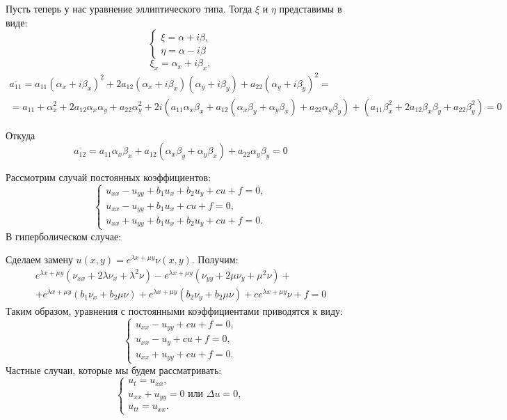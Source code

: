 \documentclass[11pt]{article}
\begin{document}
Пусть теперь у нас уравнение эллиптического типа. Тогда \(\xi\) и \(\eta\) представимы в виде:
\begin{equation*}
\begin{cases}
\xi = \alpha + i\beta, \\
\eta = \alpha - i\beta
\end{cases}
\end{equation*}
\begin{equation*}
\xi_x = \alpha_x + i\beta_x,
\end{equation*}
\begin{multline*}
\overline{a_{11}} = a_{11}(\alpha_x + i\beta_x)^2 +
2a_{12}(\alpha_x + i\beta_x)(\alpha_y + i\beta_y) + a_{22}(\alpha_y + i\beta_y)^2 = \\
= a_{11} + \alpha_x^2 + 2a_{12}\alpha_x\alpha_y + a_{22}\alpha_y^2 + 2i(a_{11}\alpha_x\beta_x +
a_{12}(\alpha_x\beta_y + \alpha_y\beta_x) + a_{22}\alpha_y\beta_y) + (a_{11}\beta_x^2 +
2a_{12}\beta_x\beta_y + a_{22}\beta_y^2) = 0
\end{multline*}

Откуда
\begin{equation*}
\overline{a_{12}} = a_{11}\alpha_x\beta_x + a_{12}(\alpha_x\beta_y + \alpha_y\beta_x) + a_{22}\alpha_y\beta_y = 0
\end{equation*}

Рассмотрим случай постоянных коэффициентов:
\begin{equation}
\begin{cases}
u_{xx} - u_{yy} + b_1u_x + b_2u_y + cu + f = 0, \\
u_{xx} - u_{yy} + b_1u_x + cu + f = 0, \\
u_{xx} + u_{yy} + b_1u_x + b_2u_y + cu + f = 0.
\end{cases}
\end{equation}
В гиперболическом случае:

Сделаем замену \(u(x, y) = e^{\lambda x + \mu y}\nu(x, y)\). Получим:
\begin{multline*}
e^{\lambda x + \mu y}(\nu_{xx} + 2\lambda\nu_x + \lambda^2\nu) - e^{\lambda x + \mu y}(\nu_{yy} + 2\mu\nu_y + \mu^2\nu) + \\
+ e^{\lambda x + \mu y}(b_1\nu_x + b_2\mu\nu) + e^{\lambda x + \mu y}(b_2\nu_y + b_2\mu\nu) + ce^{\lambda x + \mu y}\nu + f = 0
\end{multline*}
Таким образом, уравнения с постоянными коэффициентами приводятся к виду:
\begin{equation}
\begin{cases}
u_{xx} - u_{yy} + cu + f = 0, \\
u_{xx} - u_y + cu + f = 0, \\
u_{xx} + u_{yy} + cu + f = 0.
\end{cases}
\end{equation}
Частные случаи, которые мы будем рассматривать:
\begin{equation}
\begin{cases}
u_t = u_{xx}, \\
u_{xx} + u_{yy} = 0 \text{ или } \Delta u = 0, \\
u_{tt} = u_{xx}.
\end{cases}
\end{equation}
\end{document}
